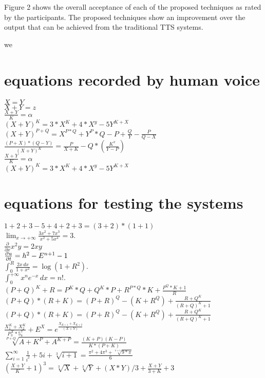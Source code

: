\documentclass{article}
\begin{document}
Figure 2 shows the overall acceptance of each of the proposed techniques as rated by the participants. The proposed techniques show an improvement over the output that can be achieved from the traditional TTS systems.




we
\appendix
\section{equations recorded by human voice}
\label{appendix:eq1}
$X=Y$ \\ [1ex]
$X+Y=z$ \\ [1ex]
$\frac{X+Y}{K}=\alpha$ \\ [1ex]
$(X+Y)^K = 3*X^K+4*X^y-5Y^{K+X}$ \\ [1ex]
$(X+Y)^{P+Q} = X^{P*Q}+Y^P*Q-P+\frac{Q}{Y}-\frac{P}{Q-X}$ \\ [1ex]
$\frac{(P+X)*(Q-Y)}{(X+Y)^K} = \frac{P}{X+K}-Q*(\frac{K^x}{Y-P})$ \\ [1ex]
$\frac{X+Y}{K}=\alpha$ \\ [1ex]
$(X+Y)^K = 3*X^K+4*X^y-5Y^{K+X}$ \\ [1ex]

\section{equations for testing the systems}
\label{appendix:eq2}
$1+2+3-5+4+2+3 = (3+2)*(1+1)$ \\ [1ex]
$\lim_{x \to +\infty} \frac{3x^2 +7x^3}{x^2 +5x^4} = 3.$ \\ [1ex]
$\displaystyle \frac{\partial}{\partial x} x^2y = 2xy$ \\ [1ex]
$\frac{\partial u}{\partial t} \\ [1ex]
   = h^2  - E^{n+1}-1 $ \\ [1ex]
$\int_0^R \frac{2x\,dx}{1+x^2} = \log(1+R^2).$ \\ [1ex]
$\int_0^{+\infty} x^n e^{-x} \,dx = n!.$ \\ [1ex]
$(P+Q)^K+R = P^K*Q+Q^K*P+R^{P*Q}*K+\frac{P^Q*K+1}{R}$ \\ [1ex]
$(P+Q)*(R+K) = (P+R)^Q-(K+R^Q)+\frac{R+Q^K}{(R+Q)^K+1}$ \\ [1ex]

$(P+Q)*(R+K) = (P+R)^Q-(K+R^Q)+\frac{R+Q^K}{(R+Q)^K+1}$ \\ [1ex]
$\frac{X_1^K+X_2^K}{P^X_3*5^x_4}+E^X = e^{\frac{X_{K+1}+X_{K+2}}{(X+Y)}}$ \\ [1ex]
$\sqrt[P+Q]{A+K^P + A^{K+P}}=\frac{(K+P)(K-P)}{K*(P+K)}$ \\ [1ex]
$\sum_{i=1}^{\infty} \frac{1}{i^2}+5i+\sqrt[3]{i+1} = \frac{\pi^2+4\pi^3+\sqrt[\pi+i]{9*\pi}}{6}$ \\ [1ex]
$(\frac{X+Y}{K}+1)^3=\sqrt[3]{X}+\sqrt[3]{Y}+(X*Y)/3+\frac{X+Y}{3+K}+3$ \\ [1ex]






\end{document}
